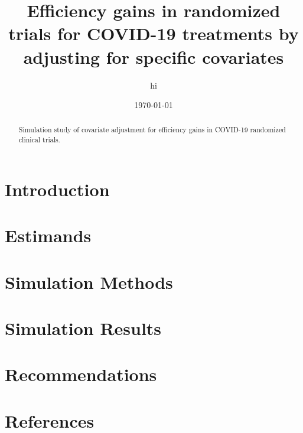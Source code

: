 \documentclass{article}
\title{
 {Efficiency gains in randomized trials for COVID-19 treatments by adjusting for specific covariates}\\
}
\author{hi}
\date{\today}
\begin{document}
\maketitle

\begin{abstract}
   Simulation study of covariate adjustment for efficiency gains in COVID-19 randomized clinical trials.
\end{abstract}

\section{Introduction}

\cite{covid19power}
\cite{diaz2019improved}
\cite{diazOrdinal}

\section{Estimands}

\section{Simulation Methods}

\section{Simulation Results}

\section{Recommendations}

\section{References}

\printbibliography
\end{document}
